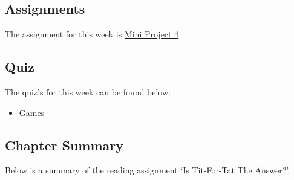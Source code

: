 \subsection{Assignments}

The assignment for this week is \href{https://applied.cs.colorado.edu/mod/assign/view.php?id=49425}{Mini Project 4}  

\subsection{Quiz}

The quiz's for this week can be found below:

\begin{itemize}
    \item \href{https://applied.cs.colorado.edu/mod/quiz/view.php?id=49415}{Games}  
\end{itemize}

\subsection{Chapter Summary}

Below is a summary of the reading assignment `Is Tit-For-Tat The Answer?'.

